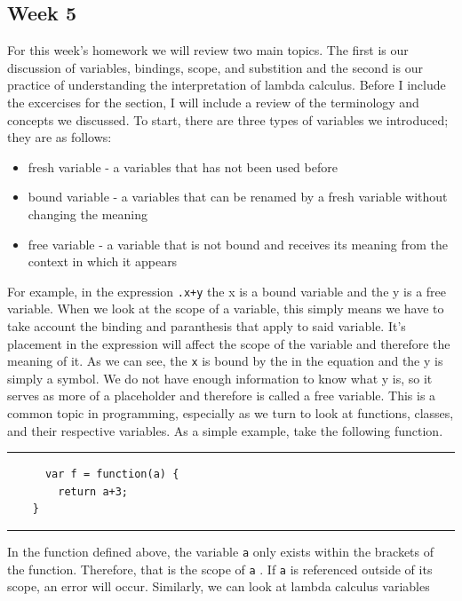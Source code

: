 \documentclass{article}
\newcommand{\mybluecode}[1]{%
{\color{codeblue}%
\texttt{#1}}%
}
\theoremstyle{theorem}
\theoremstyle{definition}
\theoremstyle{remark}
\begin{document}
\subsection{Week 5}
\indent For this week's homework we will review two main topics. The first is our discussion of variables, bindings, scope, and substition and the second is our practice of understanding the interpretation of lambda calculus. 
Before I include the excercises for the section, I will include a review of the terminology and concepts we discussed. To start, there are three types of variables we introduced; they are as follows:
\begin{itemize}
  \item[\ding{99}] fresh variable - a variables that has not been used before 
  \item[\ding{99}] bound variable - a variables that can be renamed by a fresh variable without changing the meaning
  \item[\ding{99}] free variable - a variable that is not bound and receives its meaning from the context in which it appears 
\end{itemize}
\indent For example, in the expression \texttt{\x.x+y} the x is a bound variable and the y is a free variable. When we look at the scope of a variable, this simply means we have to take account the binding and paranthesis 
that apply to said variable. It's placement in the expression will affect the scope of the variable and therefore the meaning of it. As we can see, the \texttt{x} is bound by the \texttt{\x} in the equation and the y is simply a symbol. We do not have enough information 
to know what y is, so it serves as more of a placeholder and therefore is called a free variable. This is a common topic in programming, especially as we turn to look at functions, classes, 
and their respective variables. As a simple example, take the following function. \\
\noindent
  {\color{gray} \rule{\linewidth}{0.05mm}}
\begin{center} 
  \begin{verbatim}
      var f = function(a) {
        return a+3;     
    }
  \end{verbatim}
\end{center}
\noindent
  {\color{gray} \rule{\linewidth}{0.05mm}}
\indent In the function defined above, the variable \mybluecode{a} only exists within the brackets of the function. Therefore, that is the scope of \mybluecode{a}. If \mybluecode{a} is referenced outside of its scope, an error will occur. Similarly, we can look at lambda calculus variables 
\end{document}
